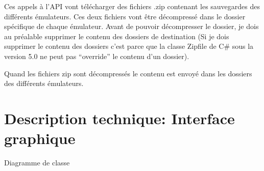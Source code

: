 \documentclass[a4paper,12pt,french]{sphinxmanual}
\begin{document}
\begin{sphinxVerbatim}[commandchars=\\\{\}]
      

               
                    


               
                   
               
\end{sphinxVerbatim}

\sphinxAtStartPar
Ces appels à l’API vont télécharger des fichiers .zip contenant les sauvegardes des différents émulateurs. Ces deux fichiers vont être décompressé dans le dossier spécifique de chaque émulateur. Avant de pouvoir décompresser le dossier, je dois au préalable supprimer le contenu des dossiers de destination (Si je dois supprimer le contenu des dossiers c’est parce que la classe Zipfile de C\# sous la version 5.0 ne peut pas “override” le contenu d’un dossier).

\sphinxAtStartPar
Quand les fichiers zip sont décompressés le contenu est envoyé dans les dossiers des différents émulateurs.


\section{Description technique: Interface graphique}
\label{\detokenize{organique:description-technique-interface-graphique}}
\sphinxAtStartPar
Diagramme de classe
\end{document}
